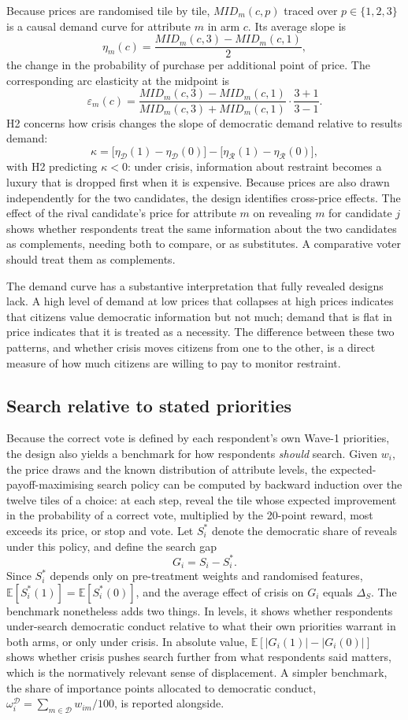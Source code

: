 \documentclass[11pt]{article}
\newcommand{\MID}{\mathit{MID}}
\newcommand{\E}{\mathbb{E}}
\newcommand{\Dem}{\mathcal{D}}
\newcommand{\Res}{\mathcal{R}}
\begin{document}
Because prices are randomised tile by tile, $\MID_m(c,p)$ traced over $p\in\{1,2,3\}$ is a causal demand curve for attribute $m$ in arm $c$. Its average slope is
\[
\eta_m(c)=\frac{\MID_m(c,3)-\MID_m(c,1)}{2},
\]
the change in the probability of purchase per additional point of price. The corresponding arc elasticity at the midpoint is
\[
\varepsilon_m(c)=\frac{\MID_m(c,3)-\MID_m(c,1)}{\MID_m(c,3)+\MID_m(c,1)}\cdot\frac{3+1}{3-1}.
\]
H2 concerns how crisis changes the slope of democratic demand relative to results demand:
\[
\kappa=\bigl[\eta_{\Dem}(1)-\eta_{\Dem}(0)\bigr]-\bigl[\eta_{\Res}(1)-\eta_{\Res}(0)\bigr],
\]
with H2 predicting $\kappa<0$: under crisis, information about restraint becomes a luxury that is dropped first when it is expensive. Because prices are also drawn independently for the two candidates, the design identifies cross-price effects. The effect of the rival candidate's price for attribute $m$ on revealing $m$ for candidate $j$ shows whether respondents treat the same information about the two candidates as complements, needing both to compare, or as substitutes. A comparative voter should treat them as complements.

The demand curve has a substantive interpretation that fully revealed designs lack. A high level of demand at low prices that collapses at high prices indicates that citizens value democratic information but not much; demand that is flat in price indicates that it is treated as a necessity. The difference between these two patterns, and whether crisis moves citizens from one to the other, is a direct measure of how much citizens are willing to pay to monitor restraint.

\subsection{Search relative to stated priorities}

Because the correct vote is defined by each respondent's own Wave-1 priorities, the design also yields a benchmark for how respondents \emph{should} search. Given $w_i$, the price draws and the known distribution of attribute levels, the expected-payoff-maximising search policy can be computed by backward induction over the twelve tiles of a choice: at each step, reveal the tile whose expected improvement in the probability of a correct vote, multiplied by the 20-point reward, most exceeds its price, or stop and vote. Let $S_i^{*}$ denote the democratic share of reveals under this policy, and define the search gap
\[
G_i=S_i-S_i^{*}.
\]
Since $S_i^{*}$ depends only on pre-treatment weights and randomised features, $\E[S_i^{*}(1)]=\E[S_i^{*}(0)]$, and the average effect of crisis on $G_i$ equals $\Delta_S$. The benchmark nonetheless adds two things. In levels, it shows whether respondents under-search democratic conduct relative to what their own priorities warrant in both arms, or only under crisis. In absolute value, $\E[|G_i(1)|-|G_i(0)|]$ shows whether crisis pushes search further from what respondents said matters, which is the normatively relevant sense of displacement. A simpler benchmark, the share of importance points allocated to democratic conduct, $\omega_i^{\Dem}=\sum_{m\in\Dem}w_{im}/100$, is reported alongside.
\end{document}

